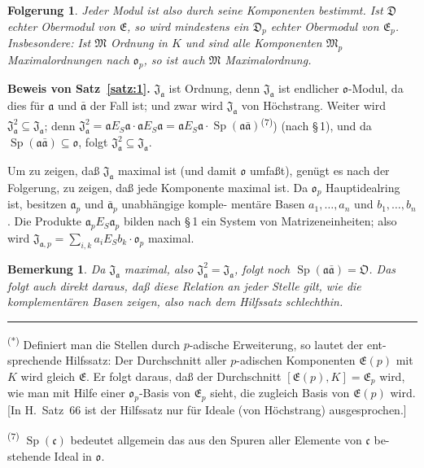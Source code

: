 \documentclass[12pt,a4paper]{article}
\theoremstyle{plain}
\newtheorem*{folgerung}{Folgerung}
\newtheorem*{bemerkung}{Bemerkung}
\DeclareMathOperator{\Sp}{Sp}
\begin{document}
\begin{folgerung}
Jeder Modul ist also durch seine Komponenten bestimmt. Ist $\mathfrak{D}$ echter Obermodul von $\mathfrak{E}$, so wird mindestens ein
$\mathfrak{D}_p$ echter Obermodul von $\mathfrak{E}_p$. Insbesondere: Ist $\mathfrak{M}$ Ordnung in $K$
und sind alle Komponenten $\mathfrak{M}_p$ Maximalordnungen nach $\mathfrak{o}_p$, so ist
auch $\mathfrak{M}$ Maximalordnung.
\end{folgerung}

\medskip
\noindent\textbf{Beweis von Satz~\ref{satz:1}.}\hspace{0.5em}%
$\mathfrak{J}_{\mathfrak{a}}$ ist Ordnung, denn $\mathfrak{J}_{\mathfrak{a}}$ ist endlicher $\mathfrak{o}$-Modul,
da dies f\"ur $\mathfrak{a}$ und $\bar{\mathfrak{a}}$ der Fall ist; und zwar wird $\mathfrak{J}_{\mathfrak{a}}$ von H\"ochstrang.
Weiter wird $\mathfrak{J}_{\mathfrak{a}}^2 \subseteq \mathfrak{J}_{\mathfrak{a}}$; denn
$\mathfrak{J}_{\mathfrak{a}}^2 = \mathfrak{a} E_S \mathfrak{a} \cdot \mathfrak{a} E_S \mathfrak{a} = \mathfrak{a} E_S \mathfrak{a} \cdot \Sp(\mathfrak{a} \bar{\mathfrak{a}})$\textsuperscript{(7)})
(nach \S\,1), und da $\Sp(\mathfrak{a} \bar{\mathfrak{a}}) \subseteq \mathfrak{o}$, folgt $\mathfrak{J}_{\mathfrak{a}}^2 \subseteq \mathfrak{J}_{\mathfrak{a}}$.

Um zu zeigen, da\ss{} $\mathfrak{J}_{\mathfrak{a}}$ maximal ist (und damit $\mathfrak{o}$ umfa\ss t), gen\"ugt
es nach der Folgerung, zu zeigen, da\ss{} jede Komponente maximal ist.
Da $\mathfrak{o}_p$ Hauptidealring ist, besitzen $\mathfrak{a}_p$ und $\bar{\mathfrak{a}}_p$ unabh\"angige komple-
ment\"are Basen $a_1, \ldots, a_n$ und $b_1, \ldots, b_n$. Die Produkte $\mathfrak{a}_p E_S \mathfrak{a}_p$
bilden nach \S\,1 ein System von Matrizeneinheiten; also wird
$\mathfrak{J}_{\mathfrak{a},p} = \sum_{i,k} a_i E_S b_k \cdot \mathfrak{o}_p$ maximal.

\begin{bemerkung}
Da $\mathfrak{J}_{\mathfrak{a}}$ maximal, also $\mathfrak{J}_{\mathfrak{a}}^2 = \mathfrak{J}_{\mathfrak{a}}$, folgt noch $\Sp(\mathfrak{a} \bar{\mathfrak{a}}) = \mathfrak{O}$.
Das folgt auch direkt daraus, da\ss{} diese Relation an jeder Stelle
gilt, wie die komplement\"aren Basen zeigen, also nach dem Hilfssatz
schlechthin.
\end{bemerkung}

\bigskip
\noindent\rule{0.3\textwidth}{0.4pt}

{\small
\textsuperscript{(*)} Definiert man die Stellen durch $p$-adische Erweiterung, so lautet der ent-
sprechende Hilfssatz: Der Durchschnitt aller $p$-adischen Komponenten $\mathfrak{E}(p)$ mit
$K$ wird gleich $\mathfrak{E}$. Er folgt daraus, da\ss{} der Durchschnitt $[\mathfrak{E}(p), K] = \mathfrak{E}_p$ wird, wie
man mit Hilfe einer $\mathfrak{o}_p$-Basis von $\mathfrak{E}_p$ sieht, die zugleich Basis von $\mathfrak{E}(p)$ wird.
[In H.\ Satz~66 ist der Hilfssatz nur f\"ur Ideale (von H\"ochstrang) ausgesprochen.]

\textsuperscript{(7)} $\Sp(\mathfrak{c})$ bedeutet allgemein das aus den Spuren aller Elemente von $\mathfrak{c}$ be-
stehende Ideal in $\mathfrak{o}$.
}
\end{document}
